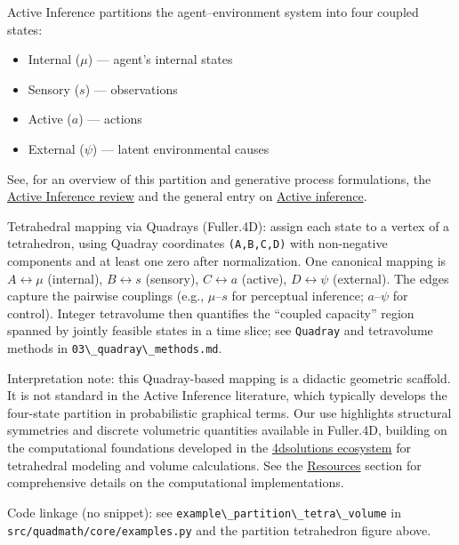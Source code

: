 \documentclass[
  10pt,
]{article}
\newcommand{\passthrough}[1]{#1}
\providecommand{\tightlist}{%
  \setlength{\itemsep}{0pt}\setlength{\parskip}{0pt}}
\begin{document}
Active Inference partitions the agent--environment system into four
coupled states:

\begin{itemize}
\tightlist
\item
  Internal (\(\mu\)) --- agent's internal states
\item
  Sensory (\(s\)) --- observations
\item
  Active (\(a\)) --- actions
\item
  External (\(\psi\)) --- latent environmental causes
\end{itemize}

See, for an overview of this partition and generative process
formulations, the
\href{https://discovery.ucl.ac.uk/id/eprint/10176959/1/1-s2.0-S1571064523001094-main.pdf}{Active
Inference review} and the general entry on
\href{https://en.wikipedia.org/wiki/Active_inference}{Active inference}.

Tetrahedral mapping via Quadrays (Fuller.4D): assign each state to a
vertex of a tetrahedron, using Quadray coordinates
\passthrough{\lstinline!(A,B,C,D)!} with non-negative components and at
least one zero after normalization. One canonical mapping is
\(A \leftrightarrow \mu\) (internal), \(B \leftrightarrow s\) (sensory),
\(C \leftrightarrow a\) (active), \(D \leftrightarrow \psi\) (external).
The edges capture the pairwise couplings (e.g., \(\mu\text{--}s\) for
perceptual inference; \(a\text{--}\psi\) for control). Integer
tetravolume then quantifies the ``coupled capacity'' region spanned by
jointly feasible states in a time slice; see
\passthrough{\lstinline!Quadray!} and tetravolume methods in
\passthrough{\lstinline!03\_quadray\_methods.md!}.

Interpretation note: this Quadray-based mapping is a didactic geometric
scaffold. It is not standard in the Active Inference literature, which
typically develops the four-state partition in probabilistic graphical
terms. Our use highlights structural symmetries and discrete volumetric
quantities available in Fuller.4D, building on the computational
foundations developed in the
\href{https://github.com/4dsolutions}{4dsolutions ecosystem} for
tetrahedral modeling and volume calculations. See the
\href{07_resources.md}{Resources} section for comprehensive details on
the computational implementations.

Code linkage (no snippet): see
\passthrough{\lstinline!example\_partition\_tetra\_volume!} in
\passthrough{\lstinline!src/quadmath/core/examples.py!} and the
partition tetrahedron figure above.
\end{document}
